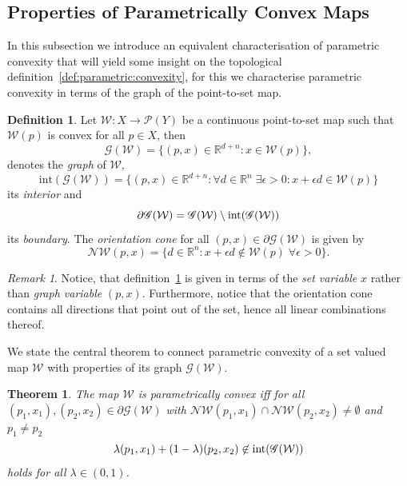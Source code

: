 \documentclass[journal]{IEEEtran}
\newcounter{thmcount}
\newtheorem{thm}[thmcount]{Theorem}
\theoremstyle{remark}
\newtheorem{rem}[thmcount]{Remark}
\theoremstyle{definition}
\newtheorem{defi}[thmcount]{Definition}
\begin{document}
\subsection{Properties of Parametrically Convex Maps}\label{ssec:properties:of:p:convex:maps}
%
In this subsection we introduce an equivalent characterisation of parametric 
convexity that will yield some insight on the topological 
definition~\ref{def:parametric:convexity}, for this we characterise parametric
convexity in terms of the graph of the point-to-set map.
%
\begin{defi}\label{def:graph:of:map}
Let $\mathcal W:X\rightarrow \mathscr P(Y)$ be a continuous point-to-set map
such that $\mathcal W(p)$ is convex for all $p\in X$, then 
%
\[
  \mathscr G(\mathcal W) = \{(p,x) \in\mathbb R^{d+n}: x\in\mathcal W(p)\},
\]
%
denotes the \emph{graph} of $\mathcal W$,
%
\[
  \text{int}(\mathscr G(\mathcal W)) = \{(p,x) \in\mathbb R^{d+n}: \forall d\in\mathbb R^n\;\exists 
  \epsilon>0 : x+\epsilon d\in \mathcal W(p)\}
\]
%
its \emph{interior} and
%
\[
  \partial \mathscr G(\mathcal W) = \mathscr G(\mathcal W)\setminus \textup{int}(\mathscr G(\mathcal W))
\]
%
its \emph{boundary}. 
%
The \emph{orientation cone} for all $(p,x)\in\partial\mathscr G(\mathcal W)$
is given by
%
\[
  \mathcal N\mathcal W(p,x) = \{d\in\mathbb R^n: x+\epsilon d \not\in \mathcal W(p)\; \forall \epsilon>0\}.
\]
\end{defi}
%
\begin{rem}
%
Notice, that definition~\ref{def:graph:of:map} is given in terms of the \emph{set variable} $x$ rather than \emph{graph variable} $(p,x)$.
%
Furthermore, notice that the orientation cone contains all directions that 
point out of the set, hence all linear combinations thereof.
%
\end{rem}
%
We state the central theorem to connect parametric convexity of a set valued 
map $\mathcal W$ with properties of its graph $\mathscr G(\mathcal W)$.
%
\begin{thm}\label{thm:p:convexity:graph}
The map $\mathcal W$ is parametrically convex iff for all $(p_1,x_1),(p_2,x_2)\in\partial\mathscr G(\mathcal W)$
with $\mathcal N\mathcal W(p_1,x_1)\cap\mathcal N\mathcal W(p_2,x_2)\neq\emptyset$ and $p_1\neq p_2$ 
%
\begin{equation}\label{eq:graph:def:p:convexity}
\lambda (p_1,x_1) + (1-\lambda) (p_2,x_2) \not\in\textup{int} (\mathscr G(\mathcal W))
\end{equation}
%
holds for all $\lambda\in(0,1)$.
%
\end{thm}
\end{document}
